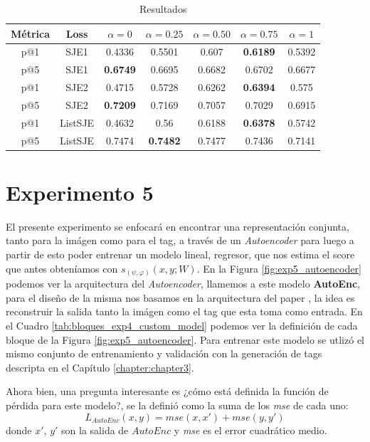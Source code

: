 \begin{table}[ht]
    \centering
    \begin{tabular}{|c|c|c|c|c|c|c|}
        \hline
        \textbf{Métrica} &
        \textbf{Loss} &
        \textbf{$\alpha = 0$} &
        \textbf{$\alpha = 0.25$} &
        \textbf{$\alpha = 0.50$} &
        \textbf{$\alpha = 0.75$} &
        \textbf{$\alpha = 1$}\\
        \hline \hline
        p@1 & SJE1 & 0.4336 & 0.5501 & 0.607 & \textbf{0.6189} & 0.5392\\
        p@5 & SJE1 & \textbf{0.6749} & 0.6695 & 0.6682 & 0.6702 & 0.6677 \\
        p@1 & SJE2 & 0.4715 & 0.5728 & 0.6262 & \textbf{0.6394} & 0.575 \\
        p@5 & SJE2 & \textbf{0.7209} & 0.7169 & 0.7057 & 0.7029 & 0.6915 \\
        p@1 & ListSJE & 0.4632 & 0.56 & 0.6188 & \textbf{0.6378} & 0.5742 \\
        p@5 & ListSJE & 0.7474 & \textbf{0.7482} & 0.7477 & 0.7436 & 0.7141 \\
        \hline
    \end{tabular}
    \caption{Resultados}
    \label{tab:results_exp4_custom_model}
\end{table}


\section{Experimento 5} \label{sec:exp5}

El presente experimento se enfocará en encontrar una representación conjunta, tanto para la imágen como para el tag, a través de un \textit{Autoencoder} para luego a partir de esto poder entrenar un modelo lineal, regresor, que nos estima el score que antes obteníamos con $s_{( \psi, \varphi)}(x, y ;W)$.
En la Figura \ref{fig:exp5_autoencoder} podemos ver la arquitectura del \textit{Autoencoder}, llamemos a este modelo \textbf{AutoEnc}, para el diseño de la misma nos basamos en la arquitectura del paper \cite{2019arXiv190405985W}, la idea es reconstruir la salida tanto la imágen como el tag que esta toma como entrada. En el Cuadro \ref{tab:bloques_exp4_custom_model} podemos ver la definición de cada bloque de la Figura \ref{fig:exp5_autoencoder}. Para entrenar este modelo se utlizó el mismo conjunto de entrenamiento y validación con la generación de tags descripta en el Capítulo \ref{chapter:chapter3}.

Ahora bien, una pregunta interesante es ¿cómo está definida la función de pérdida para este modelo?, se la definió como la suma de los \textit{mse} de cada uno:
\[L_{AutoEnc}(x, y) = mse(x, x') + mse(y, y')\]
donde $x'$, $y'$ son la salida de $AutoEnc$ y \textit{mse} es el error cuadrático medio.

